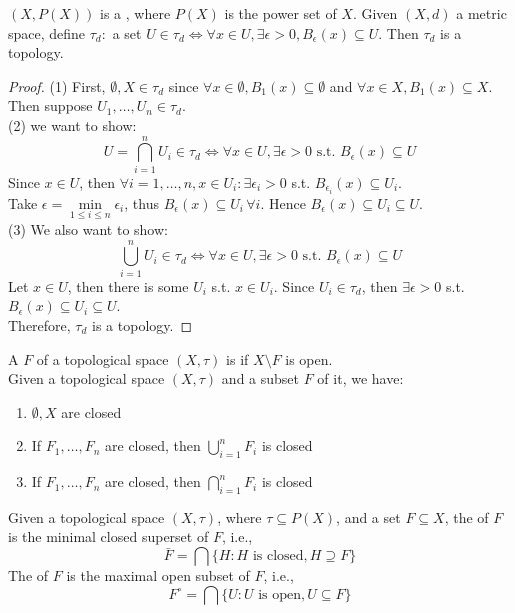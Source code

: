 \documentclass[11pt]{article}
\begin{document}
\example
$(X, P(X))$ is a , where $P(X)$ is the power set of $X$.
\example
Given $(X, d)$ a metric space, define $\tau_d: $ a set $U \in \tau_d \iff \forall x \in U, \exists \epsilon > 0, B_\epsilon(x) \subseteq U$. Then $\tau_d$ is a topology.
\begin{proof}
	(1) First, $\emptyset, X \in \tau_d$ since $\forall x \in \emptyset, B_1(x) \subseteq \emptyset$ and $\forall x \in X, B_1(x) \subseteq X$.\\
	Then suppose $U_1, \hdots, U_n \in \tau_d$.\\
	(2) we want to show:
	$$U = \bigcap_{i=1}^n U_i \in \tau_d \iff \forall x \in U, \exists \epsilon > 0 \text{ s.t. } B_\epsilon(x) \subseteq U$$
	Since $x \in U$, then $\forall i = 1, \hdots, n, x \in U_i: \exists \epsilon_i > 0$ s.t. $B_{\epsilon_i}(x) \subseteq U_i$. \\
	Take $\epsilon = \underset{1 \leq i \leq n}{\min} \epsilon_i$, thus $B_\epsilon(x) \subseteq U_i \, \forall i$. Hence $B_\epsilon(x) \subseteq U_i \subseteq U$. \\
	(3) We also want to show:
	$$\bigcup_{i=1}^n U_i \in \tau_d \iff \forall x \in U, \exists \epsilon > 0 \text{ s.t. } B_\epsilon(x) \subseteq U$$
	Let $x \in U$, then there is some $U_i$ s.t. $x \in U_i$. Since $U_i \in \tau_d$, then $\exists \epsilon >0$ s.t. $B_\epsilon(x) \subseteq U_i \subseteq U$.\\
	Therefore, $\tau_d$ is a topology.
\end{proof}

A  $F$ of a topological space $(X, \tau)$ is  if $X \setminus F$ is open. \\
\property Given a topological space $(X, \tau)$ and a subset $F$ of it, we have: 
\begin{enumerate}
	\item $\emptyset, X$ are closed
	\item If $F_1, \hdots, F_n$ are closed, then $\bigcup_{i=1}^n F_i$ is closed
	\item If $F_1, \hdots, F_n$ are closed, then $\bigcap_{i=1}^n F_i$ is closed
\end{enumerate}

Given a topological space $(X, \tau)$, where $\tau \subseteq P(X)$, and a set $F \subseteq X$, the  of $F$ is the minimal closed superset of $F$, i.e.,
$$\bar{F} = \bigcap \{H: H \text{ is closed}, H \supseteq F\}$$
The  of $F$ is the maximal open subset of $F$, i.e.,
$$F^\circ = \bigcap \{U: U \text{ is open}, U \subseteq F\}$$
\end{document}
